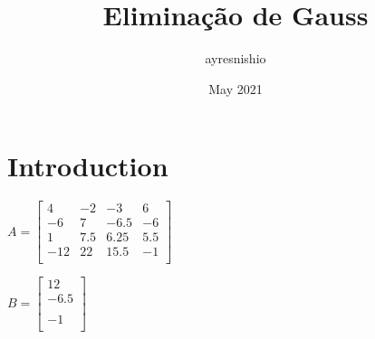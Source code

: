 \documentclass{article}
\title{Eliminação de Gauss}
\author{ayresnishio }
\date{May 2021}
\begin{document}
\maketitle

\section{Introduction}
$
A=
    \begin{bmatrix}
         4 & -2 & -3   &  6\\
        -6 &  7 & -6.5 & -6\\
        1 & 7.5 & 6.25 & 5.5\\
        -12 & 22 & 15.5 & -1\\
    \end{bmatrix}
$

$
B=
    \begin{bmatrix}
         12 \\
        -6.5\\
         \\
         -1\\
    \end{bmatrix}
$
\end{document}
